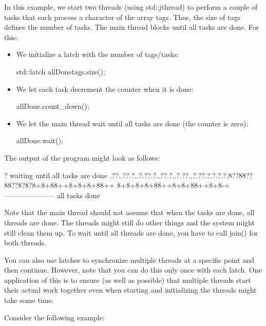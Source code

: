 In this example, we start two threads (using std::jthread) to perform a couple of tasks that each process a character of the array tags. Thus, the size of tags defines the number of tasks. The main thread blocks until all tasks are done. For this:

\begin{itemize}
\item 
We initialize a latch with the number of tags/tasks:

\begin{cpp}
std::latch allDone{tags.size()};
\end{cpp}

\item 
We let each task decrement the counter when it is done:

\begin{cpp}
allDone.count_down();
\end{cpp}

\item 
We let the main thread wait until all tasks are done (the counter is zero):

\begin{cpp}
allDone.wait();
\end{cpp}
\end{itemize}

The output of the program might look as follows:

\begin{shell}
?
waiting until all tasks are done
.??..??.?..?.??.?..??.?..?.??..?.??.?.?.?.?.8??88??88??8?8?8+8+88++8+8+8+88++
8+8+8+8+88++8+8+88++8+8-+---------------------
all tasks done
\end{shell}

Note that the main thread should not assume that when the tasks are done, all threads are done. The threads might still do other things and the system might still clean them up. To wait until all threads are done, you have to call join() for both threads.

You can also use latches to synchronize multiple threads at a specific point and then continue. However, note that you can do this only once with each latch. One application of this is to ensure (as well as possible) that multiple threads start their actual work together even when starting and initializing the threads might take some time.

Consider the following example:



